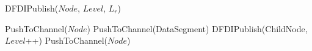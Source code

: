 \documentclass{sig-alternate}
\begin{document}
\begin{algorithm}
\caption{DFDIPublish($Node$, $Level$, $L_r$)}
\label{alg:DFDIPublish}
\begin{algorithmic}[1]

\STATE PushToChannel($Node$) 
        \STATE PushToChannel(DataSegment)
    \ENDFOR
\ELSE
        \STATE DFDIPublish(ChildNode, $Level$++)
            \STATE PushToChannel($Node$)
        \ENDIF
    \ENDFOR
\ENDIF
\end{algorithmic}
\end{algorithm}





\end{document}
